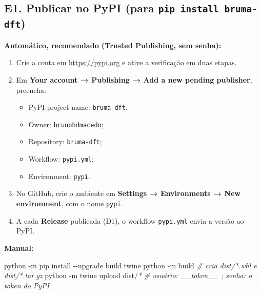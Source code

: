 \documentclass[
  10pt,
]{article}
\newenvironment{Shaded}{\begin{snugshade}}{\end{snugshade}}
\newcommand{\AttributeTok}[1]{\textcolor[rgb]{0.13,0.29,0.53}{#1}}
\newcommand{\CommentTok}[1]{\textcolor[rgb]{0.56,0.35,0.01}{\textit{#1}}}
\newcommand{\ExtensionTok}[1]{#1}
\newcommand{\NormalTok}[1]{#1}
\newcommand{\PreprocessorTok}[1]{\textcolor[rgb]{0.56,0.35,0.01}{\textit{#1}}}
\providecommand{\tightlist}{%
  \setlength{\itemsep}{0pt}\setlength{\parskip}{0pt}}
\begin{document}
\hypertarget{e1.-publicar-no-pypi-para-pip-install-bruma-dft}{%
\subsection{\texorpdfstring{E1. Publicar no PyPI (para
\texttt{pip install bruma-\allowbreak{}dft})}{E1. Publicar no PyPI (para )}}\label{e1.-publicar-no-pypi-para-pip-install-bruma-dft}}

\textbf{Automático, recomendado (Trusted Publishing, sem senha):}

\begin{enumerate}
\def\labelenumi{\arabic{enumi}.}
\tightlist
\item
  Crie a conta em \url{https://pypi.org} e ative a verificação em duas
  etapas.
\item
  Em \textbf{Your account → Publishing → Add a new pending publisher},
  preencha:

  \begin{itemize}
  \tightlist
  \item
    PyPI project name: \texttt{bruma-\allowbreak{}dft};
  \item
    Owner: \texttt{brunohdmacedo};
  \item
    Repository: \texttt{bruma-\allowbreak{}dft};
  \item
    Workflow: \texttt{pypi.\allowbreak{}yml};
  \item
    Environment: \texttt{pypi}.
  \end{itemize}
\item
  No GitHub, crie o ambiente em \textbf{Settings → Environments → New
  environment}, com o nome \texttt{pypi}.
\item
  A cada \textbf{Release} publicada (D1), o workflow
  \texttt{pypi.\allowbreak{}yml} envia a versão ao PyPI.
\end{enumerate}

\textbf{Manual:}

\begin{Shaded}
\begin{Highlighting}[]
\ExtensionTok{python} \AttributeTok{{-}m}\NormalTok{ pip install }\AttributeTok{{-}{-}upgrade}\NormalTok{ build twine}
\ExtensionTok{python} \AttributeTok{{-}m}\NormalTok{ build                  }\CommentTok{\# cria dist/*.whl e dist/*.tar.gz}
\ExtensionTok{python} \AttributeTok{{-}m}\NormalTok{ twine upload dist/}\PreprocessorTok{*}    \CommentTok{\# usuário: \_\_token\_\_ ; senha: o token do PyPI}
\end{Highlighting}
\end{Shaded}
\end{document}
